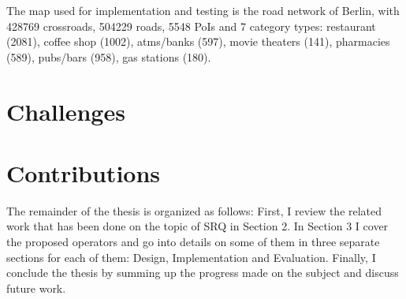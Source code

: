  
The map used for implementation and testing is the road network of Berlin, with 428769 crossroads, 504229 roads, 5548 PoIs and 7 category types: restaurant (2081), coffee shop (1002), atms/banks (597), movie theaters (141), pharmacies (589), pubs/bars (958), gas stations (180). 
\newline

\section{Challenges}

\section{Contributions}

The remainder of the thesis is organized as follows: First, I review the related work that has been done on the topic of SRQ in Section 2. In Section 3 I cover the proposed operators and go into details on some of them in three separate sections for each of them: Design, Implementation and Evaluation. Finally, I conclude the thesis by summing up the progress made on the subject and discuss future work.